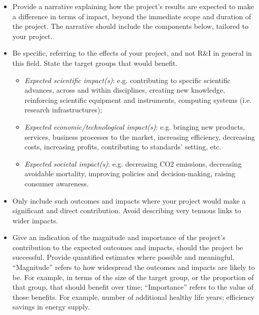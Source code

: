 \documentclass[11pt,draftproposal]{msca-pf}
\begin{document}
\begin{itemize}
    \item Provide a narrative explaining how the project’s results are expected
    to make a difference in terms of impact, beyond the immediate scope and
    duration of the project. The narrative should include the components below,
    tailored to your project.

    \item Be specific, referring to the effects of your project, and not R\&I
    in general in this field. State the target groups that would benefit.

    \begin{itemize}
        \item \emph{Expected scientific impact(s)}: e.g. contributing to specific
        scientific advances, across and within disciplines, creating new knowledge,
        reinforcing scientific equipment and instruments, computing systems (i.e.
        research infrastructures);

        \item \emph{Expected economic/technological impact(s)}: e.g. bringing new
        products, services, business processes to the market, increasing efficiency,
        decreasing costs, increasing profits, contributing to standards’ setting,
        etc.

        \item \emph{Expected societal impact(s)}: e.g. decreasing CO2 emissions,
        decreasing avoidable mortality, improving policies and decision-making,
        raising consumer awareness.
    \end{itemize}

    \item Only include such outcomes and impacts where your project would make
    a significant and direct contribution. Avoid describing very tenuous links
    to wider impacts.

    \item Give an indication of the magnitude and importance of the project's
    contribution to the expected outcomes and impacts, should the project be
    successful. Provide quantified estimates where possible and meaningful.
    ``Magnitude'' refers to how widespread the outcomes and impacts are likely
    to be. For example, in terms of the size of the target group, or the
    proportion of that group, that should benefit over time; ``Importance''
    refers to the value of those benefits. For example, number of additional
    healthy life years; efficiency savings in energy supply.
\end{itemize}
\end{document}
